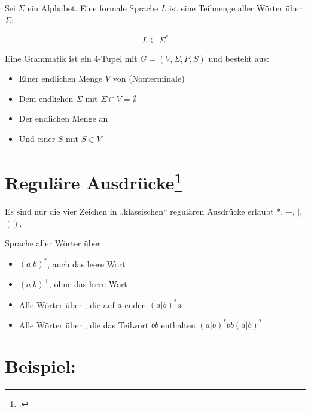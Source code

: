 \documentclass{lehramt-informatik-haupt}
\begin{document}
Sei $\Sigma$ ein Alphabet. Eine formale Sprache $L$ ist eine Teilmenge
aller Wörter über $\Sigma$:

\begin{displaymath}
L \subseteq \Sigma^*
\end{displaymath}

\bigskip

\noindent
Eine Grammatik ist ein 4-Tupel mit $G = (V, \Sigma, P, S)$ und besteht aus:

\begin{itemize}
\item Einer endlichen Menge $V$ von  (Nonterminale)

\item Dem endlichen  $\Sigma$ mit $\Sigma \cap V
= \emptyset$

\item Der endlichen Menge an 

\item Und einer  $S$ mit $S \in V$
\end{itemize}

%

\section{Reguläre Ausdrücke\footcite[Seite 22]{theo:fs:1}}

Es sind nur die vier Zeichen in „klassischen“ regulären Ausdrücke
erlaubt $*$, $+$, $|$, $()$.

Sprache aller Wörter über 
\begin{itemize}
\item $(a | b)^*$, auch das leere Wort
\item $(a | b)^+$, ohne das leere Wort
\item Alle Wörter über , die auf $a$ enden
$(a|b)^*a$
\item Alle Wörter über , die das Teilwort $bb$ enthalten
$(a|b)^*bb(a|b)^*$
\end{itemize}

%

\section{Beispiel:}
\end{document}
